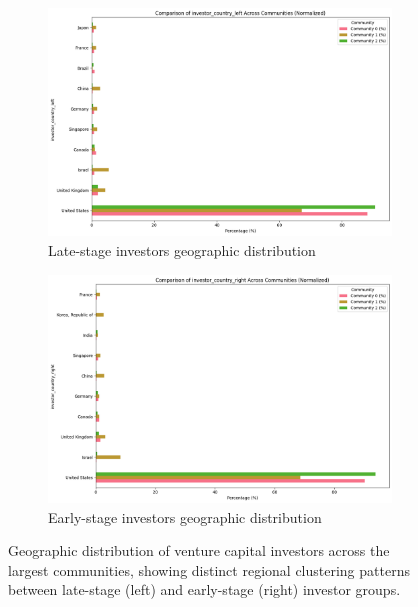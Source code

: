 \documentclass[12pt]{article}
\begin{document}
\begin{figure}[htbp]
\centering
\begin{subfigure}{0.48\textwidth}
    \centering
    \includegraphics[width=\textwidth]{./assets/investor-left-countries.png}
    \caption{Late-stage investors geographic distribution}
    \label{fig:late_stage_geo}
\end{subfigure}
\hfill
\begin{subfigure}{0.48\textwidth}
    \centering
    \includegraphics[width=\textwidth]{./assets/investor-right-countries.png}
    \caption{Early-stage investors geographic distribution}
    \label{fig:early_stage_geo}
\end{subfigure}
\caption{Geographic distribution of venture capital investors across the largest communities, showing distinct regional clustering patterns between late-stage (left) and early-stage (right) investor groups.}
\label{fig:geographic_distribution}
\end{figure}
\end{document}
